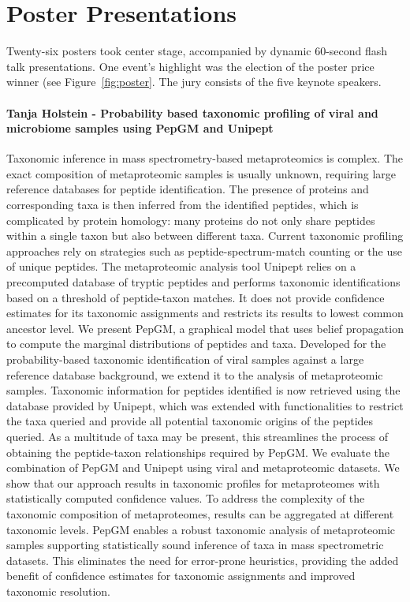 \section{Poster Presentations}


Twenty-six posters took center stage, accompanied by dynamic 60-second flash talk presentations. One event's highlight was the election of the poster price winner (see Figure~\ref{fig:poster}. The jury consists of the five keynote speakers.


\paragraph{Tanja Holstein - Probability based taxonomic profiling of viral and microbiome samples using PepGM and Unipept}

Taxonomic inference in mass spectrometry-based metaproteomics is complex. The exact composition of metaproteomic samples is usually unknown, requiring large reference databases for peptide identification. The presence of proteins and corresponding taxa is then inferred from the identified peptides, which is complicated by protein homology: many proteins do not only share peptides within a single taxon but also between different taxa. Current taxonomic profiling approaches rely on strategies such as peptide-spectrum-match counting or the use of unique peptides. The metaproteomic analysis tool Unipept relies on a precomputed database of tryptic peptides and performs taxonomic identifications based on a threshold of peptide-taxon matches. It does not provide confidence estimates for its taxonomic assignments and restricts its results to lowest common ancestor level.
We present PepGM, a graphical model that uses belief propagation to compute the marginal distributions of peptides and taxa. Developed for the probability-based taxonomic identification of viral samples against a large reference database background, we extend it to the analysis of metaproteomic samples. Taxonomic information for peptides identified is now retrieved using the database provided by Unipept, which was extended with functionalities to restrict the taxa queried and provide all potential taxonomic origins of the peptides queried.  As a multitude of taxa may be present, this streamlines the process of obtaining the peptide-taxon relationships required by PepGM.
We evaluate the combination of PepGM and Unipept using viral and metaproteomic datasets. We show that our approach results in taxonomic profiles for metaproteomes with statistically computed confidence values. To address the complexity of the taxonomic composition of metaproteomes, results can be aggregated at different taxonomic levels. PepGM enables a robust taxonomic analysis of metaproteomic samples supporting statistically sound inference of taxa in mass spectrometric datasets. This eliminates the need for error-prone heuristics, providing the added benefit of confidence estimates for taxonomic assignments and improved taxonomic resolution.

